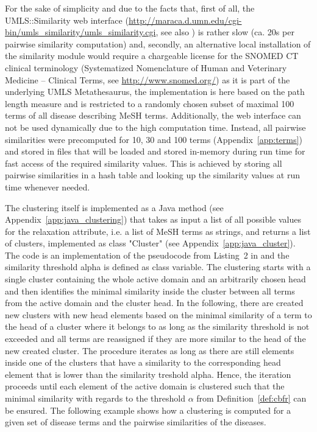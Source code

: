 For the sake of simplicity and due to the facts that, first of all, the UMLS::Similarity web interface
(\url{http://maraca.d.umn.edu/cgi-bin/umls_similarity/umls_similarity.cgi}, see also \citep{UMLS::Sim}) is rather slow (ca. 20s per pairwise similarity 
computation) and, secondly, an alternative local installation of the similarity module \citep{McInnes2009} would require a chargeable license for the SNOMED CT
clinical terminology (Systematized Nomenclature of Human and Veterinary Medicine – Clinical Terms, see \url{http://www.snomed.org/}) as it is part of the
underlying UMLS Metathesaurus, the implementation is here based on the path length measure and is restricted to a randomly chosen subset of maximal 100 terms 
of all disease describing MeSH terms. Additionally, the web interface can not be used dynamically due to the high computation time. Instead, all pairwise
similarities were precomputed for 10, 30 and 100 terms (Appendix~\ref{app:terms}) and stored in files that will be loaded and stored in-memory during run time
for fast access of the required similarity values. This is achieved by storing all pairwise similarities in a hash table and looking up the similarity values
at run time whenever needed.

The clustering itself is implemented as a Java method (see Appendix~\ref{app:java_clustering}) that takes as input a list of all possible values for the
relaxation attribute, i.e. a list of MeSH terms as strings, and returns a list of clusters, implemented as class "Cluster" (see
Appendix~\ref{app:java_cluster}). The code is an implementation of the pseudocode from Listing~2 in \cite{Wiese2014} and the similarity threshold alpha is
defined as class variable. The clustering starts with a single cluster containing the whole active domain and an arbitrarily chosen head and then identifies
the minimal similarity inside the cluster between all terms from the active domain and the cluster head. In the following, there are created new clusters with 
new head elements based on the minimal similarity of a term to the head of a cluster where it belongs to as long as the similarity threshold is not exceeded 
and all terms are reassigned if they are more similar to the head of the new created cluster. The procedure iterates as long as there are still elements inside
one of the clusters that have a similarity to the corresponding head element that is lower than the similarity treshold alpha. Hence, the iteration proceeds
until each element of the active domain is clustered such that the minimal similarity with regards to the threshold $\alpha$ from Definition~\ref{def:cbfr}
can be ensured. The following example shows how a clustering is computed for a given set of disease terms and the pairwise similarities of the diseases.

